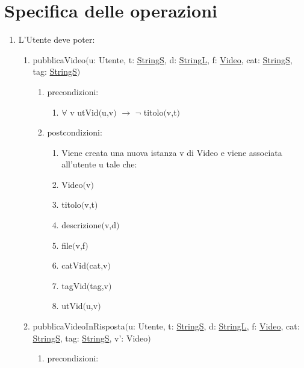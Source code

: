\documentclass{article}
\begin{document}
\newpage

\section{\label{sec:Operazioni}Specifica delle operazioni}

\begin{enumerate}
    \item\label{sec:OperazioniUtente} L'Utente deve poter:
    \begin{enumerate}
        \item pubblicaVideo$($u: Utente, t: \hyperref[sec:TipoStringS]{StringS}, d: \hyperref[sec:TipoStringL]{StringL}, f: \hyperref[sec:TipoVideo]{Video}, cat: \hyperref[sec:TipoStringS]{StringS}, tag: \hyperref[sec:TipoStringS]{StringS}$)$
        \begin{enumerate}
            \item precondizioni:
            \begin{enumerate}
                \item $\forall$ v utVid$($u,v$)$ $\rightarrow$ $\neg$ titolo$($v,t$)$
            \end{enumerate}
            \item postcondizioni:
            \begin{enumerate}
                \item Viene creata una nuova istanza v di Video e viene associata all'utente u tale che:
                \item Video$($v$)$ 
                \item titolo$($v,t$)$
                \item descrizione$($v,d$)$
                \item file$($v,f$)$ 
                \item catVid$($cat,v$)$ 
                \item tagVid$($tag,v$)$
                \item utVid$($u,v$)$
            \end{enumerate}
        \end{enumerate}
        \newpage
        \item pubblicaVideoInRisposta$($u: Utente, t: \hyperref[sec:TipoStringS]{StringS}, d: \hyperref[sec:TipoStringL]{StringL}, f: \hyperref[sec:TipoVideo]{Video}, cat: \hyperref[sec:TipoStringS]{StringS}, tag: \hyperref[sec:TipoStringS]{StringS}, v': Video$)$
        \begin{enumerate}
            \item precondizioni:

\end{enumerate}
\end{enumerate}
\end{enumerate}
\end{document}
